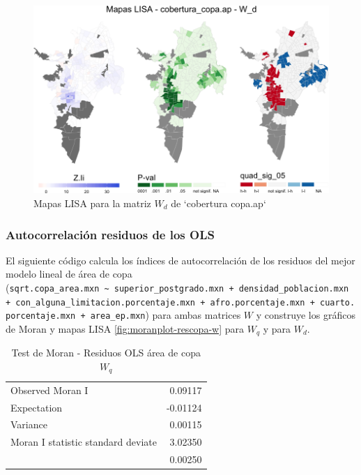 \documentclass[12pt,]{book}
\begin{document}
\begin{figure}
\includegraphics[width=1\linewidth]{tesis-unigis_files/figure-latex/mapas-lisa-copaap-wd-1} \caption{Mapas LISA para la matriz $W_d$ de `cobertura copa.ap`}\label{fig:mapas-lisa-copaap-wd}
\end{figure}

\subsubsection{Autocorrelación residuos de los
OLS}\label{autocorrelacion-residuos-de-los-ols}

El siguiente código calcula los índices de autocorrelación de los
residuos del mejor modelo lineal de área de copa
(\texttt{sqrt.copa\_area.mxn\ \textasciitilde{}\ superior\_postgrado.mxn\ +\ densidad\_poblacion.mxn\ +\ con\_alguna\_limitacion.porcentaje.mxn\ +\ afro.porcentaje.mxn\ +\ cuarto.porcentaje.mxn\ +\ area\_ep.mxn})
para ambas matrices \(W\) y construye los gráficos de Moran y mapas LISA
\ref{fig:moranplot-rescopa-w} para \(W_q\) y para \(W_d\).

\begin{table}

\caption{\label{tab:moran-rescopa-wq}Test de Moran - Residuos OLS área de copa $W_q$}
\centering
\begin{tabular}[t]{lr}
\toprule
  &  \\
\midrule
Observed Moran I & 0.09117\\
Expectation & -0.01124\\
Variance & 0.00115\\
Moran I statistic standard deviate & 3.02350\\
 & 0.00250\\
\bottomrule
\end{tabular}
\end{table}
\end{document}
